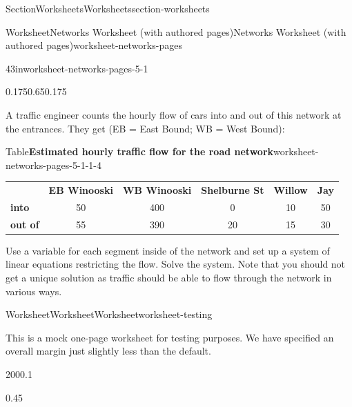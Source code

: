 \documentclass[twoside,10pt,]{article}
\newcommand{\tabularfont}{\relax}
\numberwithin{equation}{section}
\begin{document}
\begin{sectionptx}{Section}{Worksheets}{}{Worksheets}{}{}{section-worksheets}
\begin{worksheet-subsection}{Worksheet}{Networks Worksheet (with authored pages)}{}{Networks Worksheet (with authored pages)}{}{}{worksheet-networks-pages}
\begin{divisionexercise}{4}{}{3in}{worksheet-networks-pages-5-1}
\begin{image}{0.175}{0.65}{0.175}{}%
%
\end{image}%
A traffic engineer counts the hourly flow of cars into and out of this network at the entrances.  They get (EB = East Bound; WB = West Bound):%
\begin{tableptx}{Table}{\textbf{Estimated hourly traffic flow for the road network}}{worksheet-networks-pages-5-1-1-4}{}%
\centering%
{\tabularfont%
\begin{tabular}{cccccc}
{\bfseries{}}&{\bfseries{}EB Winooski}&{\bfseries{}WB Winooski}&{\bfseries{}Shelburne St}&{\bfseries{}Willow}&{\bfseries{}Jay}\tabularnewline[0pt]
\multicolumn{1}{l}{{\bfseries{}into}}&50&400&0&10&50\tabularnewline[0pt]
\multicolumn{1}{l}{{\bfseries{}out of}}&55&390&20&15&30
\end{tabular}
}%
\end{tableptx}%
Use a variable for each segment inside of the network and set up a system of linear equations restricting the flow. Solve the system.  Note that you should not get a unique solution as traffic should be able to flow through the network in various ways.%
\end{divisionexercise}%
\end{worksheet-subsection}
\restoregeometry
%
%
\typeout{************************************************}
\typeout{************************************************}
%
\begin{worksheet-subsection}{Worksheet}{Worksheet}{}{Worksheet}{}{}{worksheet-testing}
\begin{introduction}{}%
This is a mock one-page worksheet for testing purposes. We have specified an overall margin just slightly less than the default.%
\end{introduction}%
\begin{sidebyside}{2}{0}{0}{0.1}%
\begin{sbspanel}{0.45}%

\end{sbspanel}
\end{sidebyside}
\end{worksheet-subsection}
\end{sectionptx}
\end{document}
